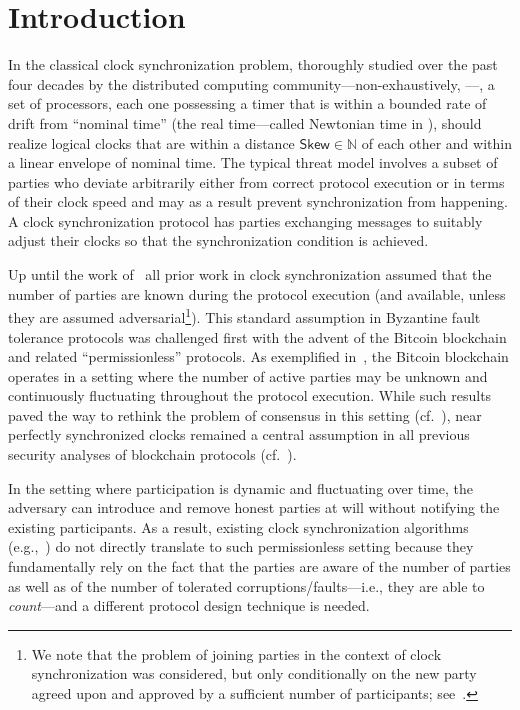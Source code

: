 \section{Introduction}
\label{sec:introduction}

In the classical clock synchronization problem, thoroughly studied over the past four decades by the distributed computing community---non-exhaustively, \cite{CACM:Lam78,PODC:LamMel84,PODC:HSSD84,JCSS:DHS86,JACM:SriTou87,InfComp:LynWel88,FC:ADDNR19,PODC:LenLos22}---, a set of processors, each one possessing a timer that is within a bounded rate of drift from ``nominal time'' (the real time---called Newtonian time in \cite{JCSS:DHS86}), should realize logical clocks that are within a distance $\mathsf{Skew}\in \mathbb{N}$ of each other and within a linear envelope of nominal time.
%
The typical threat model involves a subset of parties who deviate arbitrarily either from correct protocol execution or in terms of their clock speed and may as a result prevent synchronization from happening.
%
A clock synchronization protocol has parties exchanging messages to suitably adjust their clocks so that the synchronization condition is achieved.

Up until the work of~\cite{EC:BGKRZ21} all prior work in clock synchronization assumed that the number of parties are known during the protocol execution (and available, unless they are assumed adversarial\footnote{We note that the problem of joining parties in the context of clock synchronization was considered, but  only conditionally on the new party agreed upon and approved by a sufficient number of participants; see~\cite{PODC:HSSD84}.}).
%
This standard assumption in Byzantine fault tolerance protocols was challenged first with the advent of the Bitcoin blockchain and related ``permissionless'' protocols.
%
As exemplified in~\cite{C:GarKiaLeo17,EPRINT:GarKiaLeo20}, the Bitcoin blockchain operates in a setting where the number of active parties may be unknown and continuously fluctuating throughout the protocol execution.
%
While such results paved the way to rethink the problem of consensus in this setting (cf.~\cite{CSF:PasShi17,RSA:GarKia20}), near perfectly synchronized clocks remained a central assumption in all previous security analyses of blockchain protocols (cf.~\cite{EC:GarKiaLeo15,C:BMTZ17,EC:PasSeeash17,C:GarKiaLeo17,EPRINT:GarKiaLeo20}).

In the setting where participation is dynamic and fluctuating over time, the adversary can introduce and remove honest parties at will without notifying the existing participants.
%
As a result, existing clock synchronization algorithms (e.g.,~\cite{JACM:SriTou87,FC:ADDNR19,PODC:LenLos22}) do not directly translate to such permissionless setting because they fundamentally rely on the fact that the parties are aware of the number of parties as well as of the number of tolerated corruptions/faults---i.e., they are able to \emph{count}---and a different protocol design technique is needed.

